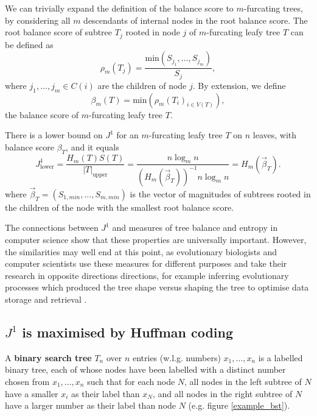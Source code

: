\begin{remark}
    We can trivially expand the definition of the balance score to $m$-furcating
    trees, by considering all $m$ descendants of internal nodes in the root
    balance score. The root balance score of subtree $T_j$ rooted in node $j$
    of $m$-furcating leafy tree $T$ can be defined as
    \begin{equation}
        \rho_m(T_j) = \frac{\text{min}(S_{j_1}, \dots, S_{j_m})}{S_j},
    \end{equation}
    where $j_1,\dots,j_m\in C(i)$ are the children of node $j$. By extension, we define
    \begin{equation}
        \beta_m(T) = \text{min}(\rho_m(T_i)_{i\in V(T)}),
    \end{equation}
    the balance score of $m$-furcating leafy tree $T$.
\end{remark}

\begin{corollary}\label{j1_lower_bound_cor}
    There is a lower bound on $J^1$ for an $m$-furcating leafy tree $T$ on $n$
    leaves, with balance score $\beta_T$, and it equals
    \begin{equation}\label{j1_lower_bound}
        J^1_\text{lower} = \frac{H_m(T)S(T)}{|T|_\text{upper}} = \frac{n\log_mn}
        {(H_m(\vec\beta_T))^{-1}n\log_mn} = H_m(\vec\beta_T).
    \end{equation}
    where $\vec\beta_T = (S_{1,min}, \dots, S_{m, min})$ is the vector of
    magnitudes of subtrees rooted in the children of the node with the smallest
    root balance score.
\end{corollary}

The connections between $J^1$ and measures of tree balance and entropy in
computer science show that these properties are universally important.
However, the similarities may well end at this point, as evolutionary
biologists and computer scientists use these measures for different purposes
and take their research in opposite directions directions, for example inferring
evolutionary processes which produced the tree shape \citep{mooers_inferring_1997}
versus shaping the tree to optimise data storage and retrieval \citep{nagaraj_optimal_1997}.

\subsection{$J^1$ is maximised by Huffman coding}

\begin{definition}
    A \textbf{binary search tree} $T_n$ over $n$ entries (w.l.g. numbers)
    $x_1,\dots,x_n$ is a labelled binary tree, each of whose nodes have been
    labelled with a distinct number chosen from $x_1,\dots,x_n$ such that for
    each node $N$, all nodes in the left subtree of $N$ have a smaller
    $x_i$ as their label than $x_N$, and all nodes in the right subtree of $N$
    have a larger number as their label than node $N$ (e.g. figure \ref{example_bst}).
\end{definition}


